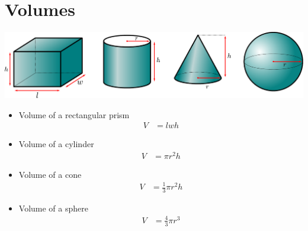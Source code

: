\section{Volumes}\label{sec volumes}
\begin{center}
 \includegraphics[width=\textwidth]{vol3d}
\end{center}
\begin{itemize}
 \item Volume of a rectangular prism
\begin{align*}
  V &= l w h
\end{align*}
 \item Volume of a cylinder
\begin{align*}
  V &= \pi r^2 h
\end{align*}
 \item Volume of a cone
\begin{align*}
  V &= \frac{1}{3} \pi r^2 h
\end{align*}

 \item Volume of a sphere
\begin{align*}
  V &= \frac{4}{3} \pi r^3
\end{align*}
\end{itemize}


